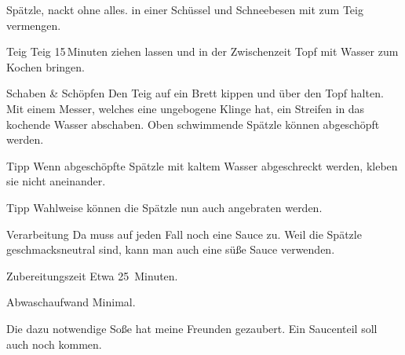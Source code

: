 \begin{recipe}{Spätzle, nackt ohne alles.}
 in einer Schüssel und Schneebesen mit
 zum Teig vermengen.
\item[Teig] Teig 15\,Minuten ziehen lassen und in der Zwischenzeit Topf mit Wasser zum Kochen bringen. 
\item[Schaben \& Schöpfen] Den Teig auf ein Brett kippen und über den Topf halten. Mit einem Messer, welches eine ungebogene Klinge hat, ein Streifen in das kochende Wasser abschaben. Oben schwimmende Spätzle können abgeschöpft werden. 
\item[Tipp] Wenn abgeschöpfte Spätzle mit kaltem Wasser abgeschreckt werden, kleben sie nicht aneinander.
\item[Tipp] Wahlweise können die Spätzle nun auch angebraten werden.
\item[Verarbeitung] Da muss auf jeden Fall noch eine Sauce zu. Weil die Spätzle geschmacksneutral sind, kann man auch eine süße Sauce verwenden.
\item[Zubereitungszeit] Etwa 25~Minuten.
\item[Abwaschaufwand] Minimal.
\end{recipe}

Die dazu notwendige Soße hat meine Freunden gezaubert. Ein Saucenteil soll auch noch kommen.
